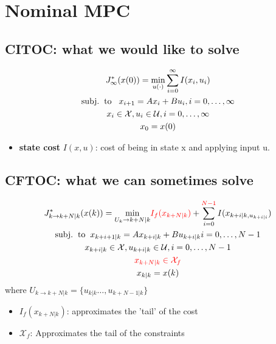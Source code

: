 \section{Nominal MPC}
 
\subsection{CITOC: what we would like to solve}

\begin{gather*}
    J^*_\infty(x(0)) = \underset{u(\cdot)}{\mathrm{min}}\sum^\infty_{i=0}I(x_i,u_i) \\
    \mathrm{subj.\hspace{2mm} to} \hspace{3mm}x_{i+1} = Ax_i + B u_i, i = 0,\dots,\infty \\
    x_i \in \mathcal{X}, u_i \in \mathcal{U}, i = 0,\dots,\infty\\
    x_0 = x(0)
\end{gather*}

\begin{itemize}
    \item \textbf{state cost} $I(x,u)$: cost of being in state x and applying input u.
\end{itemize}
\subsection{CFTOC: what we can sometimes solve}
\begin{gather*}
    J^*_{k\rightarrow k+N|k}(x(k)) = \underset{U_k\rightarrow k+ N|k}{\mathrm{min}} \textcolor{red}{I_f(x_{k+N|k})}+ \sum^{\textcolor{red}{N-1}}_{i=0}I(x_{k+i|k, u_{k+i|i}}) \\ 
    \mathrm{subj. \hspace{2mm} to \hspace{2mm}} x_{k+i+1|k}= Ax_{k+i|k} + Bu_{k+i|k} i = 0,\dots,N-1 \\
    x_{k+i|k} \in \mathcal{X}, u_{k+i|k} \in \mathcal{U}, i= 0,\dots,N-1 \\
    \textcolor{red}{x_{k+N|k} \in \mathcal{X}_f}\\
    x_{k|k} = x(k)
\end{gather*}
where $U_{k\rightarrow k + N|k}= \{u_{k|k}\dots,u_{k+N-1|k}\}$
\begin{itemize}
    \item $I_f(x_{k+N|k})$: approximates the 'tail' of the cost
    \item $\mathcal{X}_f$: Approximates the tail of the constraints 
\end{itemize}
